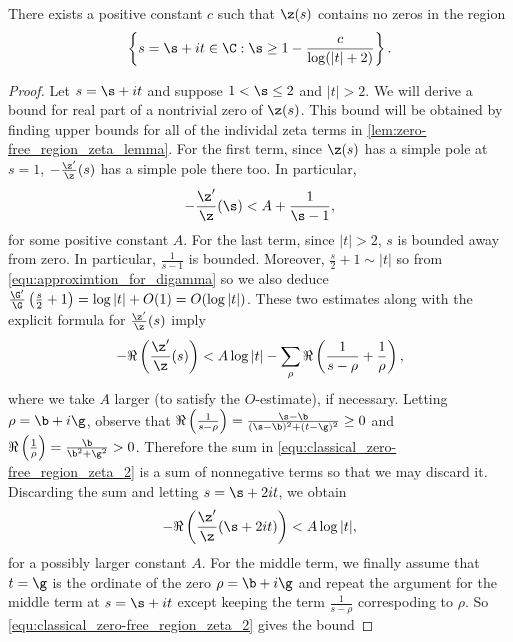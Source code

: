       \begin{theorem}
        There exists a positive constant $c$ such that $\z(s)$ contains no zeros in the region
        \[
          \left\{s = \s+it \in \C:\s \ge 1-\frac{c}{\log(|t|+2)}\right\}.
        \]
      \end{theorem}
      \begin{proof}
        Let $s = \s+it$ and suppose $1 < \s \le 2$ and $|t| > 2$. We will derive a bound for real part of a nontrivial zero of $\z(s)$. This bound will be obtained by finding upper bounds for all of the individal zeta terms in \cref{lem:zero-free_region_zeta_lemma}. For the first term, since $\z(s)$ has a simple pole at $s = 1$, $-\frac{\z'}{\z}(s)$ has a simple pole there too. In particular,
        \begin{equation}\label{equ:classical_zero-free_region_zeta_1}
          -\frac{\z'}{\z}(\s) < A+\frac{1}{\s-1},
        \end{equation}
        for some positive constant $A$. For the last term, since $|t| > 2$, $s$ is bounded away from zero. In particular, $\frac{1}{s-1}$ is bounded. Moreover, $\frac{s}{2}+1 \sim |t|$ so from \cref{equ:approximtion_for_digamma} so we also deduce $\frac{\G'}{\G}\left(\frac{s}{2}+1\right) = \log|t|+O(1) = O(\log|t|)$. These two estimates along with the explicit formula for $\frac{\z'}{\z}(s)$ imply
        \begin{equation}\label{equ:classical_zero-free_region_zeta_2}
          -\Re\left(\frac{\z'}{\z}(s)\right) < A\log|t|-\sum_{\rho}\Re\left(\frac{1}{s-\rho}+\frac{1}{\rho}\right),
        \end{equation}
        where we take $A$ larger (to satisfy the $O$-estimate), if necessary. Letting $\rho = \b+i\g$, observe that $\Re\left(\frac{1}{s-\rho}\right) = \frac{\s-\b}{(\s-\b)^{2}+(t-\g)^{2}} \ge 0$ and $\Re\left(\frac{1}{\rho}\right) = \frac{\b}{\b^{2}+\g^{2}} > 0$. Therefore the sum in \cref{equ:classical_zero-free_region_zeta_2} is a sum of nonnegative terms so that we may discard it. Discarding the sum and letting $s = \s+2it$, we obtain
        \begin{equation}\label{equ:classical_zero-free_region_zeta_3}
          -\Re\left(\frac{\z'}{\z}(\s+2it)\right) < A\log|t|,
        \end{equation}
        for a possibly larger constant $A$. For the middle term, we finally assume that $t = \g$ is the ordinate of the zero $\rho = \b+i\g$ and repeat the argument for the middle term at $s = \s+it$ except keeping the term $\frac{1}{s-\rho}$ correspoding to $\rho$. So \cref{equ:classical_zero-free_region_zeta_2} gives the bound

\end{proof}
